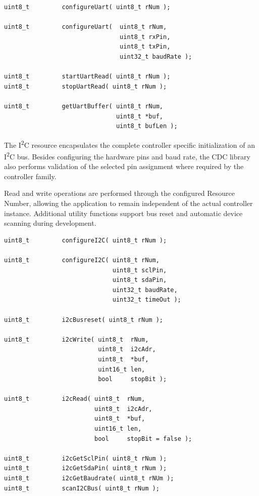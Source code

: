 \lstset{language=c++, style=api-interface}
\begin{lstlisting}
uint8_t         configureUart( uint8_t rNum );

uint8_t         configureUart(  uint8_t rNum, 
                                uint8_t rxPin, 
                                uint8_t txPin, 
                                uint32_t baudRate );
                                
uint8_t         startUartRead( uint8_t rNum );
uint8_t         stopUartRead( uint8_t rNum );

uint8_t         getUartBuffer( uint8_t rNum, 
                               uint8_t *buf, 
                               uint8_t bufLen );
\end{lstlisting}
\FloatBarrier


The I\textsuperscript{2}C resource encapsulates the complete controller specific
initialization of an I\textsuperscript{2}C bus. Besides configuring the hardware
pins and baud rate, the CDC library also performs validation of the selected pin
assignment where required by the controller family.

Read and write operations are performed through the configured Resource Number,
allowing the application to remain independent of the actual controller
instance. Additional utility functions support bus reset and automatic device
scanning during development.

\lstset{language=c++, style=api-interface}
\begin{lstlisting}
uint8_t         configureI2C( uint8_t rNum );

uint8_t         configureI2C( uint8_t rNum, 
                              uint8_t sclPin, 
                              uint8_t sdaPin, 
                              uint32_t baudRate, 
                              uint32_t timeOut );

uint8_t         i2cBusreset( uint8_t rNum );

uint8_t         i2cWrite( uint8_t  rNum, 
                          uint8_t  i2cAdr, 
                          uint8_t  *buf, 
                          uint16_t len, 
                          bool     stopBit );

uint8_t         i2cRead( uint8_t  rNum,
                         uint8_t  i2cAdr, 
                         uint8_t  *buf, 
                         uint16_t len, 
                         bool     stopBit = false );

uint8_t         i2cGetSclPin( uint8_t rNum );
uint8_t         i2cGetSdaPin( uint8_t rNum );
uint8_t         i2cGetBaudrate( uint8_t rNUm );
uint8_t         scanI2CBus( uint8_t rNum );
\end{lstlisting}
\FloatBarrier

